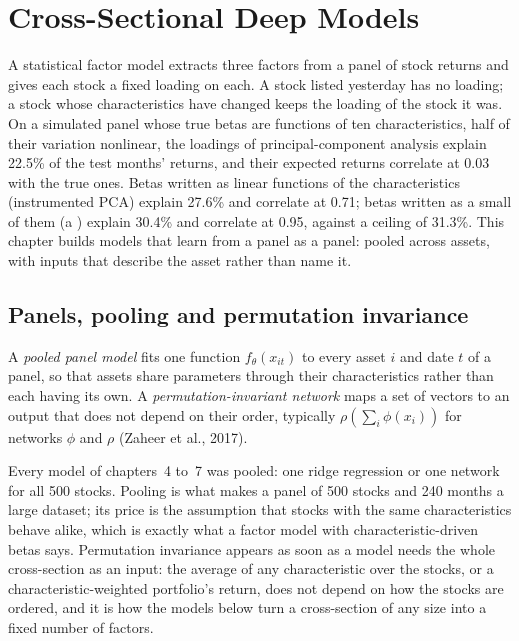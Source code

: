 \chapter{Cross-Sectional Deep Models}\label{ch:ml:cross-sectional-deep-models}

A statistical factor model extracts three factors from a panel of stock returns and gives each stock a fixed loading on
each. A stock listed yesterday has no loading; a stock whose characteristics have changed keeps the loading of the stock
it was. On a simulated panel whose true betas are functions of ten characteristics, half of their variation nonlinear,
the loadings of principal-component analysis explain 22.5\% of the test months' returns, and their expected returns
correlate at 0.03 with the true ones. Betas written as linear functions of the characteristics (instrumented PCA)
explain 27.6\% and correlate at 0.71; betas written as a small  of them (a )
explain 30.4\% and correlate at 0.95, against a ceiling of 31.3\%. This chapter builds models that learn from a panel as a
panel: pooled across assets, with inputs that describe the asset rather than name it.

\section{Panels, pooling and permutation invariance}

\begin{definition}\label{def:ml:cross-sectional-deep-models:pooled}
A \emph{pooled panel model} fits one function $f_\theta(x_{it})$ to every asset $i$ and date $t$
of a panel, so that assets share parameters through their characteristics rather than each having its own. A
\emph{permutation-invariant network} maps a set of vectors to an output that does
not depend on their order, typically $\rho(\sum_i\phi(x_i))$ for networks $\phi$ and $\rho$ (Zaheer et al., 2017).
\end{definition}

Every model of chapters~4 to~7 was pooled: one ridge regression or one network for all 500 stocks. Pooling is what makes a
panel of 500 stocks and 240 months a large dataset; its price is the assumption that stocks with the same
characteristics behave alike, which is exactly what a factor model with characteristic-driven betas says. Permutation
invariance appears as soon as a model needs the whole cross-section as an input: the average of any characteristic over
the stocks, or a characteristic-weighted portfolio's return, does not depend on how the stocks are ordered, and it is
how the models below turn a cross-section of any size into a fixed number of factors.

